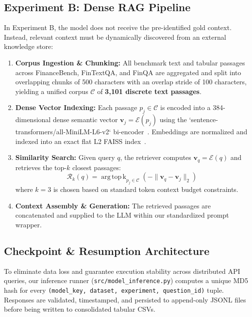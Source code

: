 \documentclass[11pt]{article}
\begin{document}
\subsection{Experiment B: Dense RAG Pipeline}
In Experiment B, the model does not receive the pre-identified gold context. Instead, relevant context must be dynamically discovered from an external knowledge store:
\begin{enumerate}
    \item \textbf{Corpus Ingestion & Chunking:} All benchmark text and tabular passages across FinanceBench, FinTextQA, and FinQA are aggregated and split into overlapping chunks of 500 characters with an overlap stride of 100 characters, yielding a unified corpus $\mathcal{C}$ of \textbf{3,101 discrete text passages}.
    \item \textbf{Dense Vector Indexing:} Each passage $p_j \in \mathcal{C}$ is encoded into a 384-dimensional dense semantic vector $\mathbf{v}_j = \mathcal{E}(p_j)$ using the `sentence-transformers/all-MiniLM-L6-v2` bi-encoder~\citep{reimers2019sentencebert}. Embeddings are normalized and indexed into an exact flat L2 FAISS index~\citep{johnson2019faiss}.
    \item \textbf{Similarity Search:} Given query $q$, the retriever computes $\mathbf{v}_q = \mathcal{E}(q)$ and retrieves the top-$k$ closest passages:
    \begin{equation}
    \mathcal{R}_k(q) = \operatorname{arg\,top\,k}_{p_j \in \mathcal{C}} \left( - \|\mathbf{v}_q - \mathbf{v}_j\|_2 \right)
    \end{equation}
    where $k=3$ is chosen based on standard token context budget constraints.
    \item \textbf{Context Assembly & Generation:} The retrieved passages are concatenated and supplied to the LLM within our standardized prompt wrapper.
\end{enumerate}

\subsection{Checkpoint & Resumption Architecture}
To eliminate data loss and guarantee execution stability across distributed API queries, our inference runner (\texttt{src/model\_inference.py}) computes a unique MD5 hash for every \texttt{(model\_key, dataset, experiment, question\_id)} tuple. Responses are validated, timestamped, and persisted to append-only JSONL files before being written to consolidated tabular CSVs.
\end{document}
